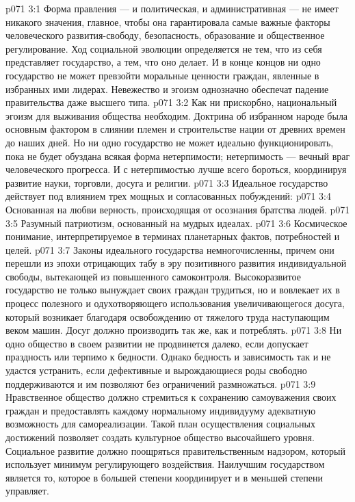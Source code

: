 \vs p071 3:1 Форма правления --- и политическая, и административная --- не имеет никакого значения, главное, чтобы она гарантировала самые важные факторы человеческого развития\hyp{}свободу, безопасность, образование и общественное регулирование. Ход социальной эволюции определяется не тем, что из себя представляет государство, а тем, что оно делает. И в конце концов ни одно государство не может превзойти моральные ценности граждан, явленные в избранных ими лидерах. Невежество и эгоизм однозначно обеспечат падение правительства даже высшего типа.
\vs p071 3:2 Как ни прискорбно, национальный эгоизм для выживания общества необходим. Доктрина об избранном народе была основным фактором в слиянии племен и строительстве нации от древних времен до наших дней. Но ни одно государство не может идеально функционировать, пока не будет обуздана всякая форма нетерпимости; нетерпимость --- вечный враг человеческого прогресса. И с нетерпимостью лучше всего бороться, координируя развитие науки, торговли, досуга и религии.
\vs p071 3:3 \pc Идеальное государство действует под влиянием трех мощных и согласованных побуждений:
\vs p071 3:4 \bibnobreakspace Основанная на любви верность, происходящая от осознания братства людей.
\vs p071 3:5 \bibnobreakspace Разумный патриотизм, основанный на мудрых идеалах.
\vs p071 3:6 \bibnobreakspace Космическое понимание, интерпретируемое в терминах планетарных фактов, потребностей и целей.
\vs p071 3:7 \pc Законы идеального государства немногочисленны, причем они перешли из эпохи отрицающих табу в эру позитивного развития индивидуальной свободы, вытекающей из повышенного самоконтроля. Высокоразвитое государство не только вынуждает своих граждан трудиться, но и вовлекает их в процесс полезного и одухотворяющего использования увеличивающегося досуга, который возникает благодаря освобождению от тяжелого труда наступающим веком машин. Досуг должно производить так же, как и потреблять.
\vs p071 3:8 Ни одно общество в своем развитии не продвинется далеко, если допускает праздность или терпимо к бедности. Однако бедность и зависимость так и не удастся устранить, если дефективные и вырождающиеся роды свободно поддерживаются и им позволяют без ограничений размножаться.
\vs p071 3:9 Нравственное общество должно стремиться к сохранению самоуважения своих граждан и предоставлять каждому нормальному индивидууму адекватную возможность для самореализации. Такой план осуществления социальных достижений позволяет создать культурное общество высочайшего уровня. Социальное развитие должно поощряться правительственным надзором, который использует минимум регулирующего воздействия. Наилучшим государством является то, которое в большей степени координирует и в меньшей степени управляет.
